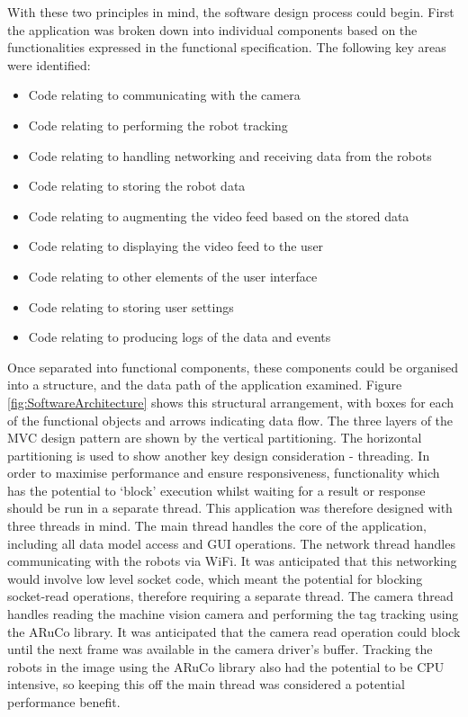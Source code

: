 With these two principles in mind, the software design process could begin. First the application was broken down into individual components based on the functionalities expressed in the functional specification. The following key areas were identified:

\begin{itemize}
\item Code relating to communicating with the camera
\item Code relating to performing the robot tracking
\item Code relating to handling networking and receiving data from the robots
\item Code relating to storing the robot data
\item Code relating to augmenting the video feed based on the stored data
\item Code relating to displaying the video feed to the user
\item Code relating to other elements of the user interface
\item Code relating to storing user settings
\item Code relating to producing logs of the data and events
\end{itemize}

Once separated into functional components, these components could be organised into a structure, and the data path of the application examined. Figure \ref{fig:SoftwareArchitecture} shows this structural arrangement, with boxes for each of the functional objects and arrows indicating data flow. The three layers of the MVC design pattern are shown by the vertical partitioning. The horizontal partitioning is used to show another key design consideration - threading. In order to maximise performance and ensure responsiveness, functionality which has the potential to `block' execution whilst waiting for a result or response should be run in a separate thread. This application was therefore designed with three threads in mind. The main thread handles the core of the application, including all data model access and GUI operations. The network thread handles communicating with the robots via WiFi. It was anticipated that this networking would involve low level socket code, which meant the potential for blocking socket-read operations, therefore requiring a separate thread. The camera thread handles reading the machine vision camera and performing the tag tracking using the ARuCo library. It was anticipated that the camera read operation could block until the next frame was available in the camera driver's buffer. Tracking the robots in the image using the ARuCo library also had the potential to be CPU intensive, so keeping this off the main thread was considered a potential performance benefit.

